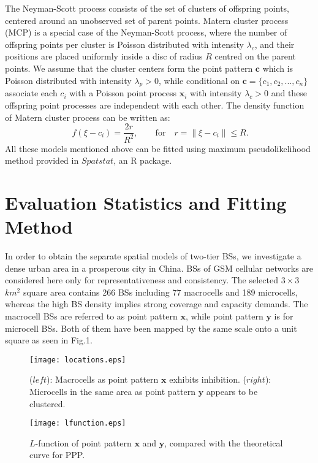 \documentclass[conference]{IEEEtran}
\begin{document}
The Neyman-Scott process\cite{chiu2013stochastic} consists of the set of clusters of offspring points, centered around an unobserved set of parent points. Matern cluster process (MCP) is a special case of the Neyman-Scott process, where the number of offspring points per cluster is Poisson distributed with intensity $\lambda_c$, and their positions are placed uniformly inside a disc of radius $R$ centred on the parent points. We assume that the cluster centers form the point pattern $\mathbf{c}$ which is Poisson distributed with intensity $\lambda_p>0$, while conditional on $\mathbf{c}=\{c_1,c_2,...,c_n\}$ associate each $c_i$ with a Poisson point process $\mathbf{x}_i$ with intensity $\lambda_c>0$ and these offspring point processes are independent with each other. The density function of Matern cluster process can be written as:
\begin{equation} \
f(\xi-c_i)=\frac{2r}{R^2}, \qquad \text{for} \quad r=\parallel\xi-c_i\parallel \leq R.
\end{equation}
All these models mentioned above can be fitted using maximum pseudolikelihood method\cite{baddeley2000practical} provided in $Spatstat$, an R package\cite{baddeley2005spatstat}.

\section{Evaluation Statistics and Fitting Method}
In order to obtain the separate spatial models of two-tier BSs, we investigate a dense urban area in a prosperous city in China. BSs of GSM cellular networks are considered here only for representativeness and consistency. The selected $3\times3$ $km^2$ square area contains 266 BSs including 77 macrocells and 189 microcells, whereas the high BS density implies strong coverage and capacity demands. The macrocell BSs are referred to as point pattern $\mathbf{x}$, while point pattern $\mathbf{y}$ is for microcell BSs. Both of them have been mapped by the same scale onto a unit square as seen in Fig.1.

\begin{figure}[!t]
\centering
\texttt{[image: locations.eps]}
\caption{($left$): Macrocells as point pattern $\mathbf{x}$ exhibits inhibition. ($right$): Microcells in the same area as point pattern $\mathbf{y}$ appears to be clustered.}
\end{figure}

\begin{figure}[!t]
\centering
\texttt{[image: lfunction.eps]}
\caption{$L$-function of point pattern $\mathbf{x}$ and $\mathbf{y}$, compared with the theoretical curve for PPP.}
\end{figure}
\end{document}
